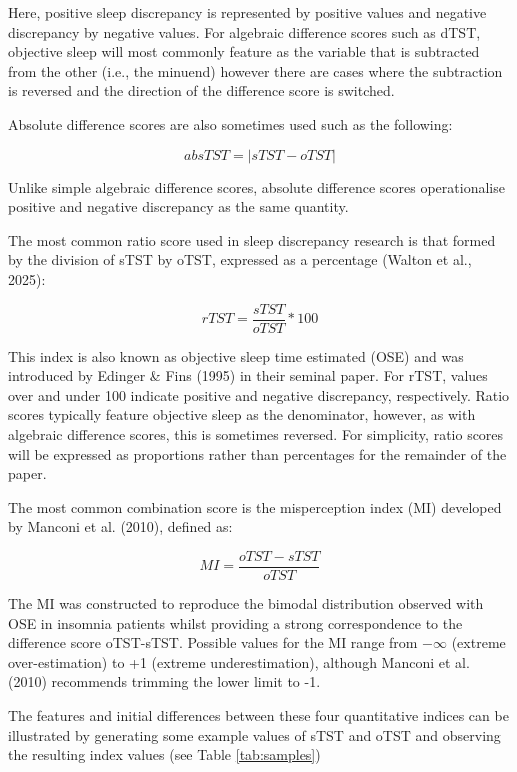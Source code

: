 \documentclass[
]{article}
\begin{document}
Here, positive sleep discrepancy is represented by positive values and negative discrepancy by negative values. For algebraic difference scores such as dTST, objective sleep will most commonly feature as the variable that is subtracted from the other (i.e., the minuend) however there are cases where the subtraction is reversed and the direction of the difference score is switched.

Absolute difference scores are also sometimes used such as the following:

\begin{equation}
absTST = |sTST - oTST|
\label{eq:absTST}
\end{equation}

Unlike simple algebraic difference scores, absolute difference scores operationalise positive and negative discrepancy as the same quantity.

The most common ratio score used in sleep discrepancy research is that formed by the division of sTST by oTST, expressed as a percentage (Walton et al., 2025):

\begin{equation}
rTST = \frac{sTST}{oTST}*100
\label{eq:rTST}
\end{equation}

This index is also known as objective sleep time estimated (OSE) and was introduced by Edinger \& Fins (1995) in their seminal paper. For rTST, values over and under 100 indicate positive and negative discrepancy, respectively. Ratio scores typically feature objective sleep as the denominator, however, as with algebraic difference scores, this is sometimes reversed. For simplicity, ratio scores will be expressed as proportions rather than percentages for the remainder of the paper.

The most common combination score is the misperception index (MI) developed by Manconi et al. (2010), defined as:

\begin{equation}
MI = \frac{oTST-sTST}{oTST}
\label{eq:MI}
\end{equation}

The MI was constructed to reproduce the bimodal distribution observed with OSE in insomnia patients whilst providing a strong correspondence to the difference score oTST-sTST. Possible values for the MI range from \(-\infty\) (extreme over-estimation) to +1 (extreme underestimation), although Manconi et al. (2010) recommends trimming the lower limit to -1.

The features and initial differences between these four quantitative indices can be illustrated by generating some example values of sTST and oTST and observing the resulting index values (see Table \ref{tab:samples})
\end{document}
